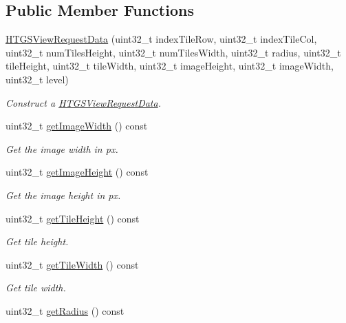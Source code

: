 \subsection*{Public Member Functions}
\begin{DoxyCompactItemize}
\item 
\hyperlink{classfi_1_1HTGSViewRequestData_a719f2451d3323b1fef9739905411ff9b}{H\+T\+G\+S\+View\+Request\+Data} (uint32\+\_\+t index\+Tile\+Row, uint32\+\_\+t index\+Tile\+Col, uint32\+\_\+t num\+Tiles\+Height, uint32\+\_\+t num\+Tiles\+Width, uint32\+\_\+t radius, uint32\+\_\+t tile\+Height, uint32\+\_\+t tile\+Width, uint32\+\_\+t image\+Height, uint32\+\_\+t image\+Width, uint32\+\_\+t level)
\begin{DoxyCompactList}\small\item\em Construct a \hyperlink{classfi_1_1HTGSViewRequestData}{H\+T\+G\+S\+View\+Request\+Data}. \end{DoxyCompactList}\item 
uint32\+\_\+t \hyperlink{classfi_1_1HTGSViewRequestData_a32e423ae766882572c8a97ff0586cf2d}{get\+Image\+Width} () const
\begin{DoxyCompactList}\small\item\em Get the image width in px. \end{DoxyCompactList}\item 
uint32\+\_\+t \hyperlink{classfi_1_1HTGSViewRequestData_acd6239aeaad186d7a27986ca0fa749b7}{get\+Image\+Height} () const
\begin{DoxyCompactList}\small\item\em Get the image height in px. \end{DoxyCompactList}\item 
uint32\+\_\+t \hyperlink{classfi_1_1HTGSViewRequestData_a0aca45f093605e99b90e4bec039c96e4}{get\+Tile\+Height} () const
\begin{DoxyCompactList}\small\item\em Get tile height. \end{DoxyCompactList}\item 
uint32\+\_\+t \hyperlink{classfi_1_1HTGSViewRequestData_a8a2cd5e4376c82ade927177dc6446b01}{get\+Tile\+Width} () const
\begin{DoxyCompactList}\small\item\em Get tile width. \end{DoxyCompactList}\item 
uint32\+\_\+t \hyperlink{classfi_1_1HTGSViewRequestData_aa94dde78818cb7bbccfbc280e09ff95f}{get\+Radius} () const

\end{DoxyCompactItemize}
